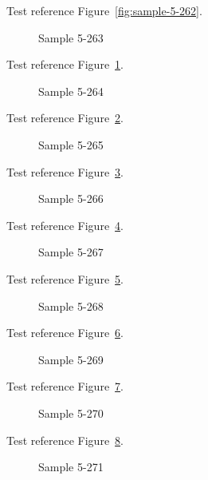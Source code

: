 Test reference Figure~\ref{fig:sample-5-262}.

\begin{figure}[tbhp]
\caption{Sample 5-263}
\label{fig:sample-5-263}
\end{figure}

Test reference Figure~\ref{fig:sample-5-263}.

\begin{figure}[tbhp]
\caption{Sample 5-264}
\label{fig:sample-5-264}
\end{figure}

Test reference Figure~\ref{fig:sample-5-264}.

\begin{figure}[tbhp]
\caption{Sample 5-265}
\label{fig:sample-5-265}
\end{figure}

Test reference Figure~\ref{fig:sample-5-265}.

\begin{figure}[tbhp]
\caption{Sample 5-266}
\label{fig:sample-5-266}
\end{figure}

Test reference Figure~\ref{fig:sample-5-266}.

\begin{figure}[tbhp]
\caption{Sample 5-267}
\label{fig:sample-5-267}
\end{figure}

Test reference Figure~\ref{fig:sample-5-267}.

\begin{figure}[tbhp]
\caption{Sample 5-268}
\label{fig:sample-5-268}
\end{figure}

Test reference Figure~\ref{fig:sample-5-268}.

\begin{figure}[tbhp]
\caption{Sample 5-269}
\label{fig:sample-5-269}
\end{figure}

Test reference Figure~\ref{fig:sample-5-269}.

\begin{figure}[tbhp]
\caption{Sample 5-270}
\label{fig:sample-5-270}
\end{figure}

Test reference Figure~\ref{fig:sample-5-270}.

\begin{figure}[tbhp]
\caption{Sample 5-271}
\label{fig:sample-5-271}
\end{figure}

